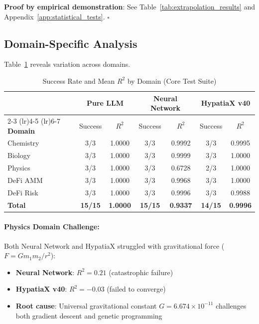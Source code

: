 \documentclass[twoside,11pt]{article}
\begin{document}
\textbf{Proof by empirical demonstration}: See Table~\ref{tab:extrapolation_results} and Appendix~\ref{app:statistical_tests}. $\square$


\subsection{Domain-Specific Analysis}

Table~\ref{tab:domain_breakdown} reveals variation across domains.

\begin{table}[htbp]
\centering
\caption{Success Rate and Mean $R^2$ by Domain (Core Test Suite)}
\label{tab:domain_breakdown}
\small
\begin{tabular}{lcccccc}
\toprule
& \multicolumn{2}{c}{\textbf{Pure LLM}} & \multicolumn{2}{c}{\textbf{Neural Network}} & \multicolumn{2}{c}{\textbf{HypatiaX v40}} \\
\cmidrule(lr){2-3} \cmidrule(lr){4-5} \cmidrule(lr){6-7}
\textbf{Domain} & Success & $R^2$ & Success & $R^2$ & Success & $R^2$ \\
\midrule
Chemistry   & 3/3 & 1.0000 & 3/3 & 0.9992 & 3/3 & 0.9995 \\
Biology     & 3/3 & 1.0000 & 3/3 & 0.9999 & 3/3 & 1.0000 \\
Physics     & 3/3 & 1.0000 & 3/3 & 0.6728 & 2/3 & 1.0000 \\
DeFi AMM    & 3/3 & 1.0000 & 3/3 & 0.9968 & 3/3 & 1.0000 \\
DeFi Risk   & 3/3 & 1.0000 & 3/3 & 0.9996 & 3/3 & 0.9988 \\
\midrule
\textbf{Total} & \textbf{15/15} & \textbf{1.0000} & \textbf{15/15} & \textbf{0.9337} & \textbf{14/15} & \textbf{0.9996} \\
\bottomrule
\end{tabular}
\end{table}

\paragraph{Physics Domain Challenge:} Both Neural Network and HypatiaX struggled with gravitational force ($F = Gm_1m_2/r^2$):
\begin{itemize}
\item \textbf{Neural Network}: $R^2 = 0.21$ (catastrophic failure)
\item \textbf{HypatiaX v40}: $R^2 = -0.03$ (failed to converge)
\item \textbf{Root cause}: Universal gravitational constant $G = 6.674 \times 10^{-11}$ challenges both gradient descent and genetic programming
\end{itemize}
\end{document}
